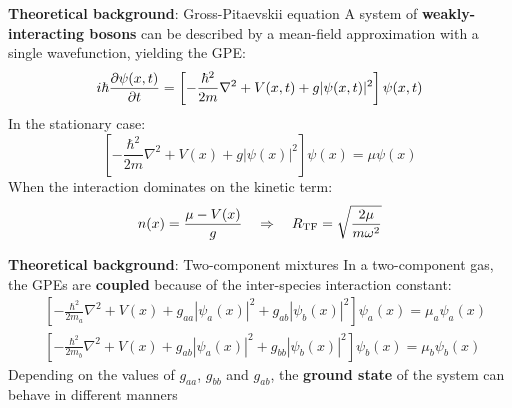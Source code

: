 \documentclass[aspectratio=169]{beamer}
\begin{document}

\begin{frame}{\textbf{Theoretical background}: Gross-Pitaevskii equation}
  A system of \textbf{weakly-interacting bosons} can be described by a mean-field approximation with a single wavefunction, yielding the GPE:
  \begin{equation*}
      i\hbar \pdv{\psi(x,t)}{t} = \left[ 
          -\frac{\hbar^2}{2m}\nabla^2 + V(x,t) + g|\psi(x,t)|^2
      \right] \psi(x,t)
  \end{equation*}
  \pause
  In the stationary case:
  \begin{equation*}
      \left[ 
          -\frac{\hbar^2}{2m}\nabla^2 + V(x) + g|\psi(x)|^2
      \right] \psi(x) = \mu \psi(x)
  \end{equation*}
  When the interaction dominates on the kinetic term:
  \begin{equation*}
      n(x) = \frac{\mu - V(x)}{g} \quad \Rightarrow \quad R_{\rm TF} = \sqrt{\frac{2\mu}{m\omega^2}}
  \end{equation*}
\end{frame}

\begin{frame}{\textbf{Theoretical background}: Two-component mixtures}
  In a two-component gas, the GPEs are \textbf{coupled} because of the inter-species interaction constant:
  \begin{align*}
      &\left[ -\frac{\hbar^2}{2m_a}\nabla^2 + V(x) + g_{aa}|\psi_a(x)|^2 + g_{ab}|\psi_b(x)|^2
      \right] \psi_a(x) = \mu_a \psi_a(x) \\
      &\left[ -\frac{\hbar^2}{2m_b}\nabla^2 + V(x) + g_{ab}|\psi_a(x)|^2 + g_{bb}|\psi_b(x)|^2
      \right] \psi_b(x) = \mu_b \psi_b(x)
  \end{align*}
  Depending on the values of $g_{aa}$, $g_{bb}$ and $g_{ab}$, the \textbf{ground state} of the system can behave in different manners
\end{frame}
\end{document}
